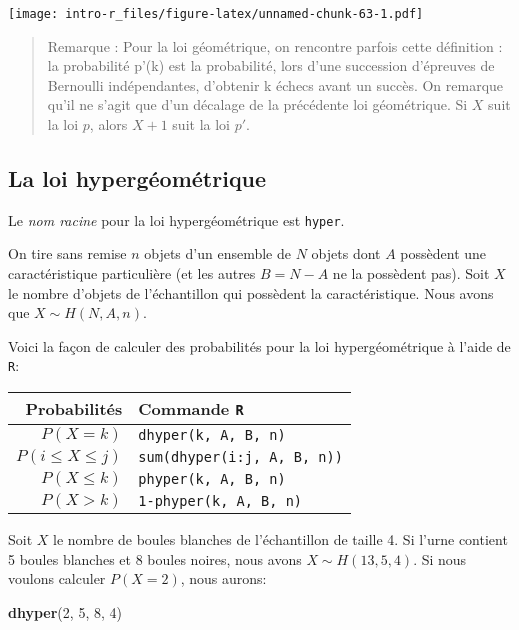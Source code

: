 \documentclass[]{book}
\newenvironment{Shaded}{\begin{snugshade}}{\end{snugshade}}
\newcommand{\KeywordTok}[1]{\textcolor[rgb]{0.13,0.29,0.53}{\textbf{#1}}}
\newcommand{\DecValTok}[1]{\textcolor[rgb]{0.00,0.00,0.81}{#1}}
\newcommand{\NormalTok}[1]{#1}
\begin{document}
\texttt{[image: intro-r\_files/figure-latex/unnamed-chunk-63-1.pdf]}

\begin{quote}
Remarque : Pour la loi géométrique, on rencontre parfois cette
définition : la probabilité p'(k) est la probabilité, lors d'une
succession d'épreuves de Bernoulli indépendantes, d'obtenir k échecs
avant un succès. On remarque qu'il ne s'agit que d'un décalage de la
précédente loi géométrique. Si \(X\) suit la loi \(p\), alors \(X+1\)
suit la loi \(p'\).
\end{quote}

\subsection{La loi hypergéométrique}\label{la-loi-hypergeometrique}

Le \emph{nom racine} pour la loi hypergéométrique est \texttt{hyper}.

On tire sans remise \(n\) objets d'un ensemble de \(N\) objets dont
\(A\) possèdent une caractéristique particulière (et les autres
\(B=N-A\) ne la possèdent pas). Soit \(X\) le nombre d'objets de
l'échantillon qui possèdent la caractéristique. Nous avons que
\(X\sim H(N,A,n)\).

Voici la façon de calculer des probabilités pour la loi hypergéométrique
à l'aide de \texttt{R}:

\begin{longtable}[]{@{}rl@{}}
\toprule
Probabilités & Commande \texttt{R}\tabularnewline
\midrule
\endhead
\(P(X=k)\) & \texttt{dhyper(k,\ A,\ B,\ n)}\tabularnewline
\(P(i\leq X \leq j)\) &
\texttt{sum(dhyper(i:j,\ A,\ B,\ n))}\tabularnewline
\(P(X\leq k)\) & \texttt{phyper(k,\ A,\ B,\ n)}\tabularnewline
\(P(X>k)\) & \texttt{1-phyper(k,\ A,\ B,\ n)}\tabularnewline
\bottomrule
\end{longtable}

Soit \(X\) le nombre de boules blanches de l'échantillon de taille 4. Si
l'urne contient 5 boules blanches et 8 boules noires, nous avons
\(X\sim H(13,5,4)\). Si nous voulons calculer \(P(X=2)\), nous aurons:

\begin{Shaded}
\begin{Highlighting}[]
\KeywordTok{dhyper}\NormalTok{(}\DecValTok{2}\NormalTok{, }\DecValTok{5}\NormalTok{, }\DecValTok{8}\NormalTok{, }\DecValTok{4}\NormalTok{)}
\end{Highlighting}
\end{Shaded}
\end{document}
